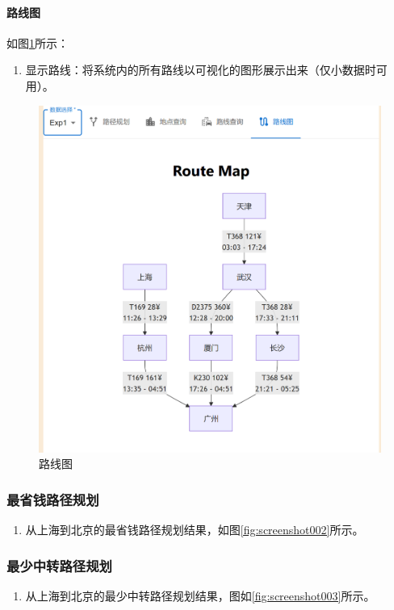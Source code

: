 \documentclass[10pt]{article}
\begin{document}
    \paragraph{路线图} 如图\ref{fig:screenshot007}所示：
    \begin{enumerate}
        \item 显示路线：将系统内的所有路线以可视化的图形展示出来（仅小数据时可用）。
    \end{enumerate}
    \begin{figure}
        \centering
        \includegraphics[width=0.7\linewidth]{img/screenshot007}
        \caption{路线图}
        \label{fig:screenshot007}
    \end{figure}

    \subsubsection{最省钱路径规划}
    \begin{enumerate}
        \item 从上海到北京的最省钱路径规划结果，如图\ref{fig:screenshot002}所示。
    \end{enumerate}

    \subsubsection{最少中转路径规划}
    \begin{enumerate}
        \item 从上海到北京的最少中转路径规划结果，图如\ref{fig:screenshot003}所示。
    \end{enumerate}
\end{document}
